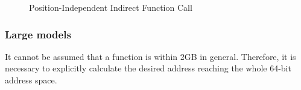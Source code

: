 \begin{figure}[H]
\Hrule
\caption{Position-Independent Indirect Function Call}
\begin{center}
\end{center}
\Hrule
\end{figure}

\subsubsection {Large models}

It cannot be assumed that a function is within 2GB in
general. Therefore, it is necessary to explicitly calculate the
desired address reaching the whole 64-bit address space.

